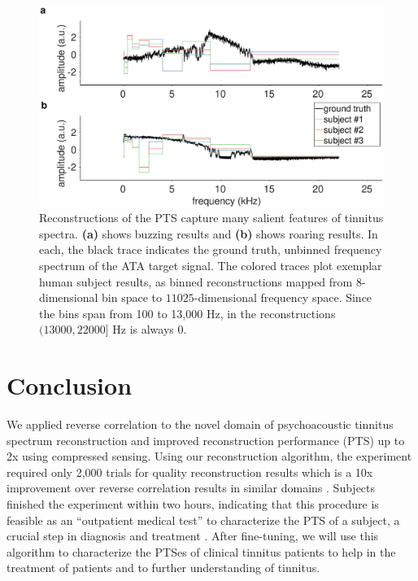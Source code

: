 \documentclass[journal]{IEEEtran}
\begin{document}
\begin{figure}[ht]
    \centering
    \includegraphics[width=\linewidth]{reconstruction_spectra.eps}
    \caption{Reconstructions of the PTS capture many salient features
    of tinnitus spectra. \textbf{(a)} shows buzzing results and \textbf{(b)}
    shows roaring results. In each, the black trace indicates the ground truth,
    unbinned frequency spectrum of the ATA target signal. The colored traces
    plot exemplar human subject results, as binned reconstructions mapped
    from $8$-dimensional bin space to $11025$-dimensional frequency space.
    Since the bins span from 100 to 13,000 Hz, 
    in the reconstructions $(13000, 22000]$ Hz is always $0$.}
    \label{fig:spectra}
\end{figure}

\section{Conclusion}

We applied reverse correlation to the novel domain of psychoacoustic tinnitus spectrum reconstruction
and improved reconstruction performance (PTS) up to 2x using compressed sensing.
Using our reconstruction algorithm, the experiment required only 2,000 trials
for quality reconstruction results which is a 10x improvement over reverse correlation results in similar domains
\cite{gosselinSuperstitiousPerceptionsReveal2003}.
Subjects finished the experiment within two hours,
indicating that this procedure is feasible as an ``outpatient medical test''
to characterize the PTS of a subject,
a crucial step in diagnosis and treatment \cite{henryTinnitusEpidemiologicPerspective2020,henryMeasurementTinnitus2016,norenaPsychoacousticCharacterizationTinnitus2002}.
After fine-tuning, we will use this algorithm
to characterize the PTSes of clinical tinnitus patients
to help in the treatment of patients and to further understanding of tinnitus.
\end{document}
